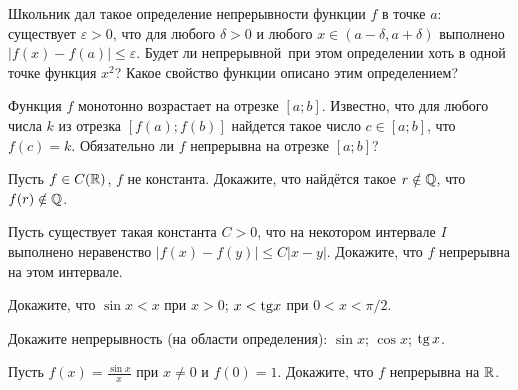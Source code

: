 \documentclass[a4paper,11pt]{article}
\begin{document}


Школьник дал такое определение непрерывности функции $f$
в точке $a$:
 существует $\varepsilon>0$,
что для любого $\delta>0$ и любого $x\in(a-\delta,a+\delta)$
выполнено $|f(x)-f(a)|\leq\varepsilon$.
 Будет ли  непрерывной\ при этом определении хоть в одной точке
функция $x^2$?
Какое свойство функции описано этим определением?

Функция $f$ монотонно возрастает на отрезке $[a;b]$. Известно,
что для любого числа $k$ из отрезка $[f(a);f(b)]$ найдется
такое число $c\in[a;b]$, что $f(c)=k$.
Обязательно ли $f$ непрерывна на отрезке $[a;b]$?

Пусть $f\in C(\mathbb{R})$, $f$ не константа.
Докажите, что найд\"ется такое $r\notin\mathbb{Q}$, что $f(r)\notin\mathbb{Q}$.





Пусть существует такая константа $C>0$, что на некотором интервале $I$ выполнено неравенство $|f(x)-f(y)|\le C|x-y|$. Докажите, что $f$ непрерывна на этом интервале.

Докажите, что  $\sin x<x$ при $x>0$;
 $x<{\rm tg} x$ при $0<x<\pi/2$.

 Докажите непрерывность (на области
определения):
 $\sin x$;
 $\cos x$;
 $\tg x$.

 Пусть $f(x)=\frac{\sin x}x$ при $x\ne0$ и $f(0)=1$. Докажите, что $f$ непрерывна на $\mathbb{R}$.
\end{document}
